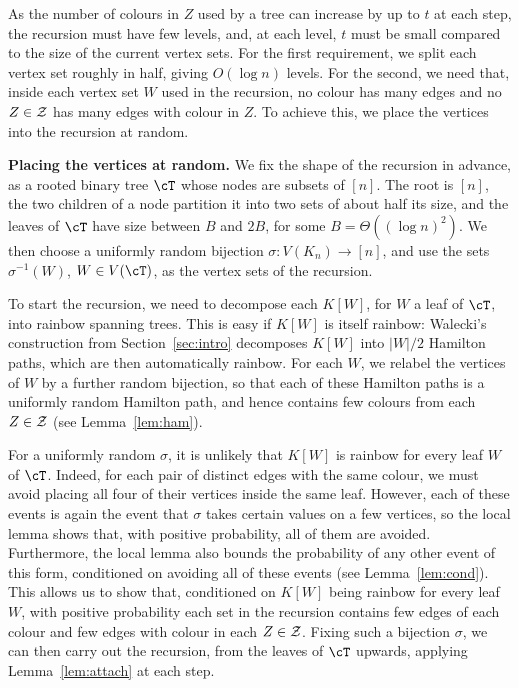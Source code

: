 As the number of colours in $Z$ used by a tree can increase by up to $t$ at each step, the recursion must have few levels, and, at each level, $t$ must be small compared to the size of the current vertex sets.
For the first requirement, we split each vertex set roughly in half, giving $O(\log n)$ levels.
For the second, we need that, inside each vertex set $W$ used in the recursion, no colour has many edges and no $Z\in \mathcal{Z}$ has many edges with colour in $Z$.
To achieve this, we place the vertices into the recursion at random.

\smallskip

\noindent\textbf{Placing the vertices at random.}
We fix the shape of the recursion in advance, as a rooted binary tree $\cT$ whose nodes are subsets of $[n]$.
The root is $[n]$, the two children of a node partition it into two sets of about half its size, and the leaves of $\cT$ have size between $B$ and $2B$, for some $B=\Theta((\log n)^2)$.
We then choose a uniformly random bijection $\sigma:V(K_n)\to [n]$, and use the sets $\sigma^{-1}(W)$, $W\in V(\cT)$, as the vertex sets of the recursion.

To start the recursion, we need to decompose each $K[W]$, for $W$ a leaf of $\cT$, into rainbow spanning trees.
This is easy if $K[W]$ is itself rainbow: Walecki's construction from Section~\ref{sec:intro} decomposes $K[W]$ into $|W|/2$ Hamilton paths, which are then automatically rainbow.
For each $W$, we relabel the vertices of $W$ by a further random bijection, so that each of these Hamilton paths is a uniformly random Hamilton path, and hence contains few colours from each $Z\in\mathcal{Z}$ (see Lemma~\ref{lem:ham}).

For a uniformly random $\sigma$, it is unlikely that $K[W]$ is rainbow for every leaf $W$ of $\cT$.
Indeed, for each pair of distinct edges with the same colour, we must avoid placing all four of their vertices inside the same leaf.
However, each of these events is again the event that $\sigma$ takes certain values on a few vertices, so the local lemma shows that, with positive probability, all of them are avoided.
Furthermore, the local lemma also bounds the probability of any other event of this form, conditioned on avoiding all of these events (see Lemma~\ref{lem:cond}).
This allows us to show that, conditioned on $K[W]$ being rainbow for every leaf $W$, with positive probability each set in the recursion contains few edges of each colour and few edges with colour in each $Z\in \mathcal{Z}$.
Fixing such a bijection $\sigma$, we can then carry out the recursion, from the leaves of $\cT$ upwards, applying Lemma~\ref{lem:attach} at each step.

